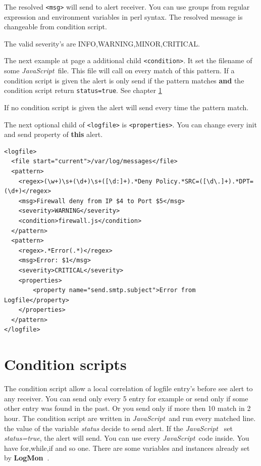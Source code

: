 \documentclass[11pt,a4paper]{article}
\newcommand{\logmon}{\textbf{LogMon\ }}
\newcommand{\js}{\textit{JavaScript\ }}
\begin{document}
The resolved \verb#<msg># will send to alert receiver. You can use groups from
regular expression and environment variables in perl syntax. The resolved message
is changeable from condition script.

The valid severity's are INFO,WARNING,MINOR,CRITICAL.

The next example at page \pageref{ex:logfile2} a additional child
\verb#<condition>#. It set the filename of some \js file. This file will
call on every match of this pattern. If a condition script is given the alert
is only send if the pattern matches \textbf{and} the condition script return
\verb#status=true#. See chapter \ref{sec:conditions}

If no condition script is given the alert will send every time the pattern
match.

The next optional child of \verb#<logfile># is \verb#<properties>#. You can
change every init and send property of \textbf{this} alert.

\begin{samepage}
\label{ex:logfile2}

\begin{verbatim}
<logfile>
  <file start="current">/var/log/messages</file>
  <pattern>
    <regex>(\w+)\s+(\d+)\s+([\d:]+).*Deny Policy.*SRC=([\d\.]+).*DPT=(\d+)</regex>
    <msg>Firewall deny from IP $4 to Port $5</msg>
    <severity>WARNING</severity>
    <condition>firewall.js</condition>
  </pattern>
  <pattern>
    <regex>.*Error(.*)</regex>
    <msg>Error: $1</msg>
    <severity>CRITICAL</severity>
    <properties>
        <property name="send.smtp.subject">Error from Logfile</property>
    </properties>
  </pattern>
</logfile>
\end{verbatim}
\end{samepage}

\section{Condition scripts}
\label{sec:conditions}

The condition script allow a local correlation of logfile entry's before
see alert to any receiver. You can send only every 5 entry for example or send only
if some other entry was found in the past. Or you send only if more then 10 match
in 2 hour. The condition script are written in \js and run every matched line.
the value of the variable \textit{status} decide to send alert. If the \js
set \textit{status=true}, the alert will send. You can use every \js code
inside. You have for,while,if and so one. There are some variables and instances
already set by \logmon.
\end{document}
